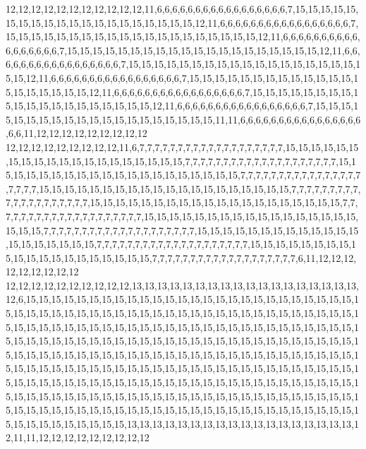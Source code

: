 12,12,12,12,12,12,12,12,12,12,12,11,6,6,6,6,6,6,6,6,6,6,6,6,6,6,6,6,6,7,15,15,15,15,15,15,15,15,15,15,15,15,15,15,15,15,15,15,15,15,12,11,6,6,6,6,6,6,6,6,6,6,6,6,6,6,6,6,6,7,15,15,15,15,15,15,15,15,15,15,15,15,15,15,15,15,15,15,15,15,12,11,6,6,6,6,6,6,6,6,6,6,6,6,6,6,6,6,6,7,15,15,15,15,15,15,15,15,15,15,15,15,15,15,15,15,15,15,15,15,12,11,6,6,6,6,6,6,6,6,6,6,6,6,6,6,6,6,6,7,15,15,15,15,15,15,15,15,15,15,15,15,15,15,15,15,15,15,15,15,12,11,6,6,6,6,6,6,6,6,6,6,6,6,6,6,6,6,6,7,15,15,15,15,15,15,15,15,15,15,15,15,15,15,15,15,15,15,15,15,12,11,6,6,6,6,6,6,6,6,6,6,6,6,6,6,6,6,6,7,15,15,15,15,15,15,15,15,15,15,15,15,15,15,15,15,15,15,15,15,12,11,6,6,6,6,6,6,6,6,6,6,6,6,6,6,6,6,6,7,15,15,15,15,15,15,15,15,15,15,15,15,15,15,15,15,15,15,15,15,11,11,6,6,6,6,6,6,6,6,6,6,6,6,6,6,6,6,6,6,11,12,12,12,12,12,12,12,12,12
12,12,12,12,12,12,12,12,12,11,6,7,7,7,7,7,7,7,7,7,7,7,7,7,7,7,7,7,7,7,15,15,15,15,15,15,15,15,15,15,15,15,15,15,15,15,15,15,15,15,7,7,7,7,7,7,7,7,7,7,7,7,7,7,7,7,7,7,7,7,15,15,15,15,15,15,15,15,15,15,15,15,15,15,15,15,15,15,15,15,7,7,7,7,7,7,7,7,7,7,7,7,7,7,7,7,7,7,7,7,15,15,15,15,15,15,15,15,15,15,15,15,15,15,15,15,15,15,15,15,7,7,7,7,7,7,7,7,7,7,7,7,7,7,7,7,7,7,7,7,15,15,15,15,15,15,15,15,15,15,15,15,15,15,15,15,15,15,15,15,7,7,7,7,7,7,7,7,7,7,7,7,7,7,7,7,7,7,7,7,15,15,15,15,15,15,15,15,15,15,15,15,15,15,15,15,15,15,15,15,7,7,7,7,7,7,7,7,7,7,7,7,7,7,7,7,7,7,7,7,15,15,15,15,15,15,15,15,15,15,15,15,15,15,15,15,15,15,15,15,7,7,7,7,7,7,7,7,7,7,7,7,7,7,7,7,7,7,7,7,15,15,15,15,15,15,15,15,15,15,15,15,15,15,15,15,15,15,15,15,7,7,7,7,7,7,7,7,7,7,7,7,7,7,7,7,7,7,7,6,11,12,12,12,12,12,12,12,12,12
12,12,12,12,12,12,12,12,12,12,13,13,13,13,13,13,13,13,13,13,13,13,13,13,13,13,13,13,12,6,15,15,15,15,15,15,15,15,15,15,15,15,15,15,15,15,15,15,15,15,15,15,15,15,15,15,15,15,15,15,15,15,15,15,15,15,15,15,15,15,15,15,15,15,15,15,15,15,15,15,15,15,15,15,15,15,15,15,15,15,15,15,15,15,15,15,15,15,15,15,15,15,15,15,15,15,15,15,15,15,15,15,15,15,15,15,15,15,15,15,15,15,15,15,15,15,15,15,15,15,15,15,15,15,15,15,15,15,15,15,15,15,15,15,15,15,15,15,15,15,15,15,15,15,15,15,15,15,15,15,15,15,15,15,15,15,15,15,15,15,15,15,15,15,15,15,15,15,15,15,15,15,15,15,15,15,15,15,15,15,15,15,15,15,15,15,15,15,15,15,15,15,15,15,15,15,15,15,15,15,15,15,15,15,15,15,15,15,15,15,15,15,15,15,15,15,15,15,15,15,15,15,15,15,15,15,15,15,15,15,15,15,15,15,15,15,15,15,15,15,15,15,15,15,15,15,15,15,15,15,15,15,15,15,15,15,15,15,15,15,15,15,15,15,15,15,15,15,15,15,15,15,15,15,15,15,15,15,15,15,13,13,13,13,13,13,13,13,13,13,13,13,13,13,13,13,13,13,12,11,11,12,12,12,12,12,12,12,12,12
